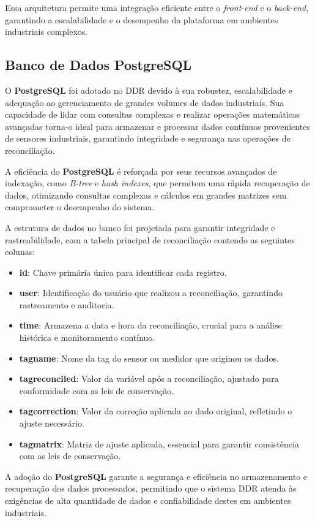 Essa arquitetura permite uma integração eficiente entre o \textit{front-end} e o \textit{back-end}, garantindo a escalabilidade e o desempenho da plataforma em ambientes industriais complexos.


\subsection{Banco de Dados PostgreSQL}

O \textbf{PostgreSQL} foi adotado no DDR devido à sua robustez, escalabilidade e adequação ao gerenciamento de grandes volumes de dados industriais. Sua capacidade de lidar com consultas complexas e realizar operações matemáticas avançadas torna-o ideal para armazenar e processar dados contínuos provenientes de sensores industriais, garantindo integridade e segurança nas operações de reconciliação.

A eficiência do \textbf{PostgreSQL} é reforçada por seus recursos avançados de indexação, como \textit{B-tree} e \textit{hash indexes}, que permitem uma rápida recuperação de dados, otimizando consultas complexas e cálculos em grandes matrizes sem comprometer o desempenho do sistema.

A estrutura de dados no banco foi projetada para garantir integridade e rastreabilidade, com a tabela principal de reconciliação contendo as seguintes colunas:

\begin{itemize}
    \item \textbf{id}: Chave primária única para identificar cada registro.
    \item \textbf{user}: Identificação do usuário que realizou a reconciliação, garantindo rastreamento e auditoria.
    \item \textbf{time}: Armazena a data e hora da reconciliação, crucial para a análise histórica e monitoramento contínuo.
    \item \textbf{tagname}: Nome da tag do sensor ou medidor que originou os dados.
    \item \textbf{tagreconciled}: Valor da variável após a reconciliação, ajustado para conformidade com as leis de conservação.
    \item \textbf{tagcorrection}: Valor da correção aplicada ao dado original, refletindo o ajuste necessário.
    \item \textbf{tagmatrix}: Matriz de ajuste aplicada, essencial para garantir consistência com as leis de conservação.
\end{itemize}

A adoção do \textbf{PostgreSQL} garante a segurança e eficiência no armazenamento e recuperação dos dados processados, permitindo que o sistema DDR atenda às exigências de alta quantidade de dados e confiabilidade destes em ambientes industriais.
